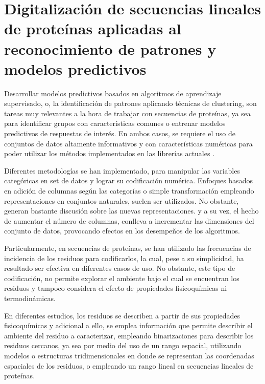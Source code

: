 \chapter{Digitalización de secuencias lineales de proteínas aplicadas al reconocimiento de patrones y modelos predictivos \label{cap3}}

\ifpdf
    \graphicspath{{Chapter3/Figs/Raster/}{Chapter3/Figs/PDF/}{Chapter3/Figs/}}
\else
    \graphicspath{{Chapter3/Figs/Vector/}{Chapter3/Figs/}}
\fi

Desarrollar modelos predictivos basados en algoritmos de aprendizaje supervisado, o, la identificación de patrones aplicando técnicas de clustering, son tareas muy relevantes a la hora de trabajar con secuencias de proteínas, ya sea para identificar grupos con características comunes o entrenar modelos predictivos de respuestas de interés. En ambos casos, se requiere el uso de conjuntos de datos altamente informativos y con características numéricas para poder utilizar los métodos implementados en las librerías actuales \cite{pedregosa2011scikit}.

Diferentes metodologías se han implementado, para manipular las variables categóricas en set de datos y lograr su codificación numérica. Enfoques basados en adición de columnas según las categorías o simple transformación empleando representaciones en conjuntos naturales, suelen ser utilizados. No obstante, generan bastante discusión sobre las nuevas representaciones. y a su vez, el hecho de aumentar el número de columnas, conlleva a incrementar las dimensiones del conjunto de datos, provocando efectos en los desempeños de los algoritmos. 

Particularmente, en secuencias de proteínas, se han utilizado las frecuencias de incidencia de los residuos para codificarlos, la cual, pese a su simplicidad, ha resultado ser efectiva en diferentes casos de uso. No obstante, este tipo de codificación, no permite explorar el ambiente bajo el cual se encuentran los residuos y tampoco considera el efecto de propiedades fisicoquímicas ni termodinámicas.

En diferentes estudios, los residuos se describen a partir de sus propiedades fisicoquímicas y adicional a ello, se emplea información que permite describir el ambiente del residuo a caracterizar, empleando binarizaciones para describir los residuos cercanos, ya sea por medio del uso de un rango espacial, utilizando modelos o estructuras tridimensionales en donde se representan las coordenadas espaciales de los residuos, o empleando un rango lineal en secuencias lineales de proteínas.

